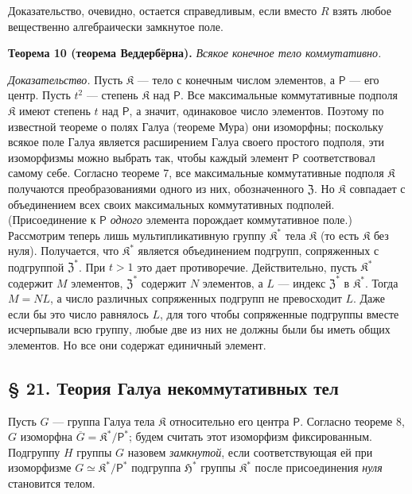\documentclass[11pt]{article}
\begin{document}
Доказательство, очевидно, остается справедливым, если вместо \(R\) взять любое вещественно алгебраически замкнутое поле.

\textbf{Теорема 10 (теорема Веддербёрна).} \emph{Всякое конечное тело коммутативно.}

\emph{Доказательство.} Пусть \(\mathfrak K\) --- тело с конечным числом элементов, а \(\mathsf P\) --- его центр. Пусть \(t^2\) --- степень \(\mathfrak K\) над \(\mathsf P\). Все максимальные коммутативные подполя \(\mathfrak K\) имеют степень \(t\) над \(\mathsf P\), а значит, одинаковое число элементов. Поэтому по известной теореме о полях Галуа (теореме Мура) они изоморфны; поскольку всякое поле Галуа является расширением Галуа своего простого подполя, эти изоморфизмы можно выбрать так, чтобы каждый элемент \(\mathsf P\) соответствовал самому себе. Согласно теореме 7, все максимальные коммутативные подполя \(\mathfrak K\) получаются преобразованиями одного из них, обозначенного \(\mathfrak Z\). Но \(\mathfrak K\) совпадает с объединением всех своих максимальных коммутативных подполей. (Присоединение к \(\mathsf P\) \emph{одного} элемента порождает коммутативное поле.) Рассмотрим теперь лишь мультипликативную группу \(\mathfrak K^*\) тела \(\mathfrak K\) (то есть \(\mathfrak K\) без нуля). Получается, что \(\mathfrak K^*\) является объединением подгрупп, сопряженных с подгруппой \(\mathfrak Z^*\). При \(t>1\) это дает противоречие. Действительно, пусть \(\mathfrak K^*\) содержит \(M\) элементов, \(\mathfrak Z^*\) содержит \(N\) элементов, а \(L\) --- индекс \(\mathfrak Z^*\) в \(\mathfrak K^*\). Тогда \(M=NL\), а число различных сопряженных подгрупп не превосходит \(L\). Даже если бы это число равнялось \(L\), для того чтобы сопряженные подгруппы вместе исчерпывали всю группу, любые две из них не должны были бы иметь общих элементов. Но все они содержат единичный элемент.

\subsection*{§ 21. Теория Галуа некоммутативных тел}\label{die-galoissche-theorie-der-nichtkommutativen-koerper}

Пусть \(G\) --- группа Галуа тела \(\mathfrak K\) относительно его центра \(\mathsf P\). Согласно теореме 8, \(G\) изоморфна \(\overline G=\mathfrak K^*/\mathsf P^*\); будем считать этот изоморфизм фиксированным. Подгруппу \(H\) группы \(G\) назовем \emph{замкнутой}, если соответствующая ей при изоморфизме \(G\simeq\mathfrak K^*/\mathsf P^*\) подгруппа \(\mathfrak H^*\) группы \(\mathfrak K^*\) после присоединения \emph{нуля} становится телом.
\end{document}
